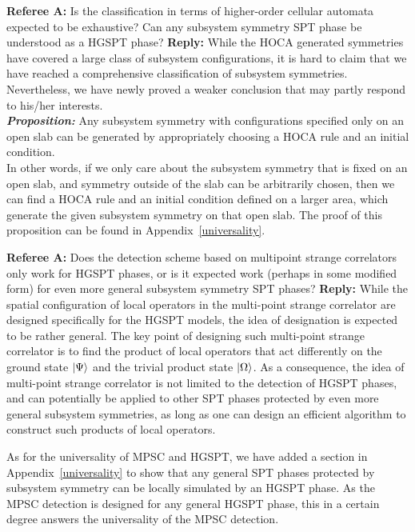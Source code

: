 \documentclass{article}
\begin{document}
\begin{tcolorbox}[title=Reply 2 (point-to-point reply),breakable]
\textbf{Referee A:} Is the classification in terms of higher-order cellular automata
expected to be exhaustive? Can any subsystem symmetry SPT phase be
understood as a HGSPT phase?
\tcblower
\textbf{Reply:} While the HOCA generated symmetries have covered a large class of subsystem configurations, it is hard to claim that we have reached a comprehensive classification of subsystem symmetries. Nevertheless, we have newly proved a weaker conclusion that may partly respond to his/her interests. \\

\textbf{\textit{Proposition:}} Any subsystem symmetry with configurations specified only on an open slab can be generated by appropriately choosing a HOCA rule and an initial condition. \\

In other words, if we only care about the subsystem symmetry that is fixed on an open slab, and symmetry outside of the slab can be arbitrarily chosen, then we can find a HOCA rule and an initial condition defined on a larger area, which generate the given subsystem symmetry on that open slab. The proof of this proposition can be found in Appendix~\ref{universality}.

\end{tcolorbox}

\begin{tcolorbox}[title=Reply 3 (point-to-point reply),breakable]
\textbf{Referee A:}  Does the detection scheme based on multipoint strange correlators only work for HGSPT phases, or is it expected work (perhaps in some modified form) for even more general subsystem symmetry SPT phases?
\tcblower
\textbf{Reply:}
While the spatial configuration of local operators in the multi-point strange correlator are designed specifically for the HGSPT models, the idea of designation is expected to be rather general. The key point of designing such multi-point strange correlator is to find the product of local operators that act differently on the ground state $\ket{\Psi}$ and the trivial product state $\ket{\Omega}$. As a consequence, the idea of multi-point strange correlator is not limited to the detection of HGSPT phases, and can potentially be applied to other SPT phases protected by even more general subsystem symmetries, as long as one can design an efficient algorithm to construct such products of local operators.

As for the universality of MPSC and HGSPT, we have added a section in Appendix~\ref{universality} to show that any general SPT phases protected by subsystem symmetry can be locally simulated by an HGSPT phase. As the MPSC detection is designed for any general HGSPT phase, this in a certain degree answers the universality of the MPSC detection.
\end{tcolorbox}
\end{document}

